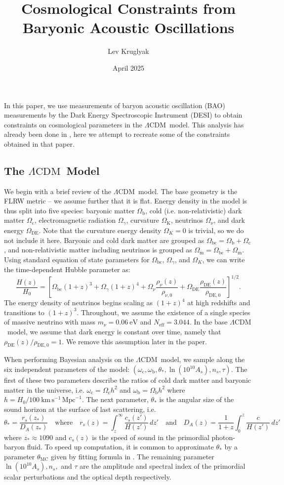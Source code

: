 \documentclass{lkx_paper}
\title{Cosmological Constraints from \\Baryonic Acoustic Oscillations}
\date{April 2025}
\author{Lev Kruglyak}
\renewcommand{\b}{{\mathrm{b}}}
\renewcommand{\c}{{\mathrm{c}}}
\newcommand{\bc}{{\mathrm{bc}}}
\newcommand{\K}{{\mathrm{K}}}
\newcommand{\m}{{\mathrm{m}}}
\newcommand{\DE}{{\mathrm{DE}}}
\newcommand{\MC}{{\mathrm{MC}}}
\newcommand{\LCDM}{$\Lambda\mathrm{CDM}$~}
\newcommand{\Neff}{{N_\mathrm{eff}}}
\providecommand{\eVsi}[1]{\qty{#1}{\mathrm{eV}}}
\providecommand{\Hsi}[1]{\qty{#1}{\km\,\s^{-1}\,\mathrm{Mpc}^{-1}}}
\begin{document}
In this paper, we use measurements of baryon acoustic oscillation (BAO) measurements by the Dark Energy Spectroscopic Instrument (DESI) to obtain constraints on cosmological parameters in the \LCDM model. This analysis has already been done in \cite{desicollaboration2025desidr2resultsii}, here we attempt to recreate some of the constraints obtained in that paper.

\subsection*{The \LCDM Model}
We begin with a brief review of the \LCDM model. The base geometry is the FLRW metric -- we assume further that it is flat.
Energy density in the model is thus split into five species: baryonic matter $\Omega_\b$, cold (i.e. non-relativistic) dark matter $\Omega_\c$, electromagnetic radiation $\Omega_\gamma$, curvature $\Omega_\K$, neutrinos $\Omega_\nu$, and dark energy $\Omega_\DE$. Note that the curvature energy density $\Omega_K=0$ is trivial, so we do not include it here. Baryonic and cold dark matter are grouped as $\Omega_\bc=\Omega_\b+\Omega_\c$, and non-relativistic matter including neutrinos is grouped as $\Omega_\m=\Omega_\bc+\Omega_\m$.
Using standard equation of state parameters for $\Omega_\bc$, $\Omega_\gamma$, and $\Omega_K$, we can write the time-dependent Hubble parameter as:
\begin{equation}
  \frac{H(z)}{H_0} = 
  \left[\Omega_\bc(1+z)^3 + \Omega_\gamma(1+z)^4+\Omega_\nu\frac{\rho_\nu(z)}{\rho_{\nu,0}} + \Omega_\DE \frac{\rho_\DE(z)}{\rho_{\DE,0}}\right]^{1/2}.
\end{equation}
The energy density of neutrinos begins scaling as $(1+z)^4$ at high redshifts and transitions to $(1+z)^3$. Throughout, we assume the existence of a single species of massive neutrino with mass $m_\nu = \eVsi{0.06}$ and $\Neff=3.044$. In the base \LCDM model, we assume that dark energy is constant over time, namely that $\rho_{\DE}(z)/\rho_{\DE,0}=1$. We remove this assumption later in the paper.

When performing Bayesian analysis on the \LCDM model, we sample along the six independent parameters of the model: $(\omega_\c, \omega_\b, \theta_*, \ln(10^{10}A_s), n_s, \tau)$. The first of these two parameters describe the ratios of cold dark matter and baryonic matter in the universe, i.e. $\omega_\c=\Omega_\c h^2$ and $\omega_\b = \Omega_\b h^2$ where $h=H_0/\Hsi{100}$. The next parameter, $\theta_*$ is the angular size of the sound horizon at the surface of last scattering, i.e.
\begin{equation}
  \theta_* = \frac{r_s(z_*)}{D_A(z_*)}\quad\textrm{where}\quad
  r_s(z) = \int_z^\infty \frac{c_s(z')}{H(z')}\,dz'\quad\textrm{and}\quad D_A(z)=\frac{1}{1+z}\int_0^z\frac{c}{H(z')}\,dz'
\end{equation}
where $z_*\approx 1090$ and $c_s(z)$ is the speed of sound in the primordial photon-baryon fluid. To speed up computation, it is common to approximate $\theta_*$ by a parameter $\theta_\MC$ given by fitting formula in \cite{Lewis_2000}. The remaining parameter $\ln(10^{10} A_s), n_s,$ and $\tau$ are the amplitude and spectral index of the primordial scalar perturbations and the optical depth respectively. 
\end{document}
